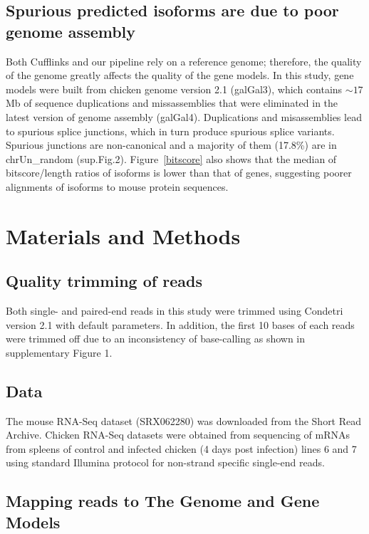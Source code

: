 \documentclass[10pt]{article}
\begin{document}
\subsection*{Spurious predicted isoforms are due to poor genome assembly}
Both Cufflinks and our pipeline rely on a reference genome; therefore, the
quality of the genome greatly affects the quality of the gene models.  In this
study, gene models were built from chicken genome version 2.1 (galGal3), which
contains $\sim17$ Mb of sequence duplications and missassemblies that were
eliminated in the latest version of genome assembly (galGal4).  Duplications
and misassemblies lead to spurious splice junctions, which in turn produce
spurious splice variants. Spurious junctions are non-canonical and a majority
of them (17.8\%) are in chrUn\_random (sup.Fig.2). Figure~\ref{bitscore} also
shows that the median of bitscore/length ratios of isoforms is lower than that
of genes, suggesting poorer alignments of isoforms to mouse protein sequences.

\section*{Materials and Methods}

\subsection*{Quality trimming of reads}
Both single- and paired-end reads in this study were trimmed using Condetri
version 2.1 with default parameters.  In addition, the first 10 bases of each
reads were trimmed off due to an inconsistency of base-calling as shown in
supplementary Figure 1.

\subsection*{Data}

The mouse RNA-Seq dataset (SRX062280) was downloaded from the Short Read
Archive.  Chicken RNA-Seq datasets were obtained from sequencing of mRNAs from
spleens of control and infected chicken (4 days post infection) lines 6 and 7
using standard Illumina protocol for non-strand specific single-end reads.

\subsection*{Mapping reads to The Genome and Gene Models}
\end{document}
